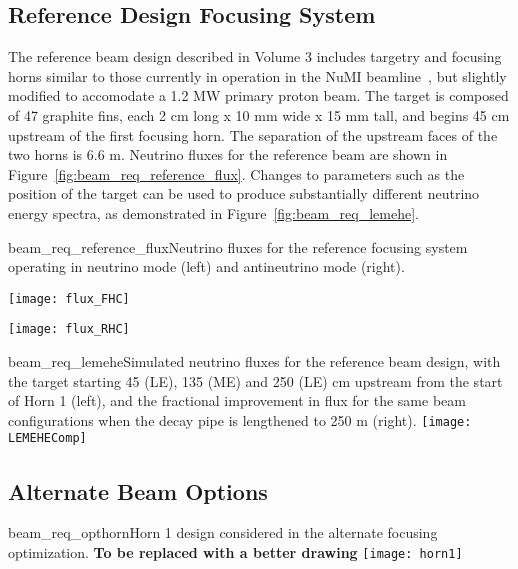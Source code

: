 \subsection{Reference Design Focusing System}
\label{subsec:reference-design-focusing-system}
The reference beam design described in Volume 3 includes targetry and
focusing horns similar to those currently in operation in the NuMI
beamline~\cite{numitdr}, but slightly modified to accomodate a 1.2 MW primary proton beam.  The
target is composed of 47 graphite fins, each 2 cm long x 10 mm wide x
15 mm tall, and begins 45 cm upstream of the first focusing horn.  The separation
of the upstream faces of the two horns is 6.6 m.  Neutrino fluxes for the reference beam are
shown in Figure~\ref{fig:beam_req_reference_flux}.  Changes to
parameters such as the position of the target can be used to produce substantially different neutrino
energy spectra, as demonstrated in Figure~\ref{fig:beam_req_lemehe}.

\begin{cdrfigure}{beam_req_reference_flux}{Neutrino fluxes for the reference 
    focusing system operating in neutrino mode (left) and antineutrino 
    mode (right).} 
\centering 
\begin{minipage}{0.45\textwidth}
\centering 
\texttt{[image: flux\_FHC]}
\end{minipage}\hfill 
\begin{minipage}{0.45\textwidth}
\centering 
\texttt{[image: flux\_RHC]}
\end{minipage}
\end{cdrfigure}
\begin{cdrfigure} {beam_req_lemehe}{Simulated neutrino fluxes for the 
    reference beam design, with the target starting 45 (LE), 135 (ME) 
    and 250 (LE) cm upstream from the start of Horn 1 (left), and the
    fractional improvement in flux for the same beam configurations 
    when the decay pipe is lengthened to 250 m (right).}
    \texttt{[image: LEMEHEComp]}
  \end{cdrfigure}
\subsection{Alternate Beam Options}
\label{subsec:alternative-focusing-systems}
\begin{cdrfigure}{beam_req_opthorn}{Horn 1 design considered 
    in the alternate focusing optimization. \bf{To be replaced with a 
      better drawing}}
  \texttt{[image: horn1]}
\end{cdrfigure}

